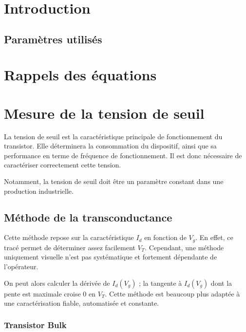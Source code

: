 \documentclass[a4paper,11pt]{report}
\begin{document}


\chapter*{Introduction}


\section*{Paramètres utilisés}

\chapter{Rappels des équations}

\chapter{Mesure de la tension de seuil}
La tension de seuil est la caractéristique principale de fonctionnement du transistor. Elle déterminera la consommation du dispositif, ainsi que sa performance en terme de fréquence de fonctionnement. Il est donc nécessaire de caractériser correctement cette tension.

Notamment, la tension de seuil doit être un paramètre constant dans une production industrielle.

\section{Méthode de la transconductance}
Cette méthode repose sur la caractéristique $I_d$ en fonction de $V_g$. En effet, ce tracé permet de déterminer assez facilement $V_T$. Cependant, une méthode uniquement visuelle n'est pas systématique et fortement dépendante de l'opérateur.

On peut alors calculer la dérivée de $I_d(V_g)$ ; la tangente à $I_d(V_g)$ dont la pente est maximale croise 0 en $V_T$. Cette méthode est beaucoup plus adaptée à une caractérisation fiable, automatisée et constante.



\subsection{Transistor Bulk}
\end{document}
